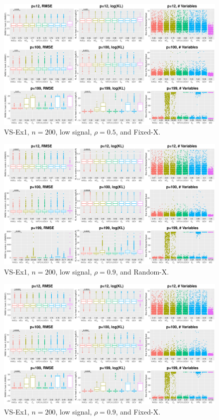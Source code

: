 \begin{figure}[!ht]
\centering
\includegraphics[width=\textwidth]{figures/supplement/fixedx_VS-Ex1_n200_lsnr_rho05.eps}
\caption{VS-Ex1, $n=200$, low signal, $\rho=0.5$, and Fixed-X.}
\end{figure}
\clearpage
\begin{figure}[!ht]
\centering
\includegraphics[width=\textwidth]{figures/supplement/randomx_VS-Ex1_n200_lsnr_rho09.eps}
\caption{VS-Ex1, $n=200$, low signal, $\rho=0.9$, and Random-X.}
\end{figure}
\begin{figure}[!ht]
\centering
\includegraphics[width=\textwidth]{figures/supplement/fixedx_VS-Ex1_n200_lsnr_rho09.eps}
\caption{VS-Ex1, $n=200$, low signal, $\rho=0.9$, and Fixed-X.}
\end{figure}
